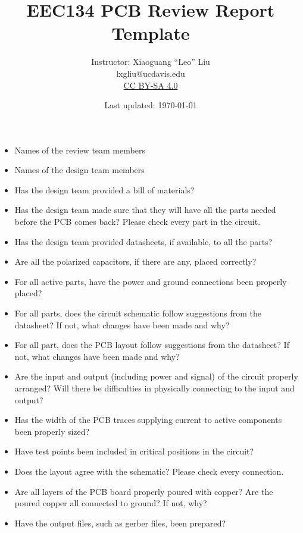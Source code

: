 \documentclass[letterpaper, 11pt]{article}
\title{EEC134 PCB Review Report Template}
\author{Instructor: Xiaoguang ``Leo'' Liu \\ lxgliu@ucdavis.edu \\ \small \href{http://creativecommons.org/licenses/by-sa/4.0/}{CC BY-SA 4.0}}
\date{Last updated: \today}
\begin{document}
\maketitle

\begin{itemize}[itemsep=3ex]

	\item Names of the review team members

	\item Names of the design team members

	\item Has the design team provided a bill of materials?

	\item Has the design team made sure that they will have all the parts needed before the PCB comes back? Please check every part in the circuit. 

	\item Has the design team provided datasheets, if available, to all the parts?

	\item Are all the polarized capacitors, if there are any, placed correctly?

	\item For all active parts, have the power and ground connections been properly placed?

	\item For all parts, does the circuit schematic follow suggestions from the datasheet? If not, what changes have been made and why?

	\item For all part, does the PCB layout follow suggestions from the datasheet? If not, what changes have been made and why?

	\item Are the input and output (including power and signal) of the circuit properly arranged? Will there be difficulties in physically connecting to the input and output?
	
	\item Has the width of the PCB traces supplying current to active components been properly sized?
	 
	\item Have test points been included in critical positions in the circuit?

	\item Does the layout agree with the schematic? Please check every connection. 

	\item Are all layers of the PCB board properly poured with copper? Are the poured copper all connected to ground? If not, why?

	\item Have the output files, such as gerber files, been prepared?

\end{itemize}
\end{document}
